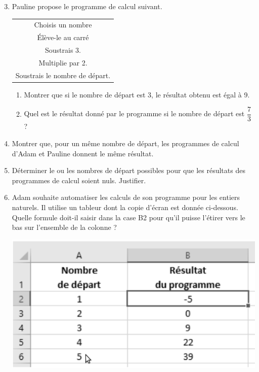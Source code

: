 \begin{enumerate}
	\setcounter{enumi}{2}
	\item Pauline propose le programme de calcul suivant.
	\begin{center}
	\begin{tabular}{|c|}
	\hline
	Choisis un nombre\\
	Élève-le au carré\\
	Soustrais 3.\\
	Multiplie par 2.\\
	Soustrais le nombre de départ.\\ 
	\hline 
	\end{tabular} 
	\end{center}
	\begin{enumerate}
		\item Montrer que si le nombre de départ est 3, le résultat obtenu est égal à 9.
		\item Quel est le résultat donné par le programme si le nombre de départ est $\dfrac{7}{3}$ ?
	\end{enumerate}
	\item Montrer que, pour un même nombre de départ, les programmes de calcul d’Adam et
Pauline donnent le même résultat.
	\item Déterminer le ou les nombres de départ possibles pour que les résultats des programmes
de calcul soient nuls. Justifier.
	\item Adam souhaite automatiser les calculs de son programme pour les entiers naturels. Il
utilise un tableur dont la copie d’écran est donnée ci-dessous.
Quelle formule doit-il saisir dans la case B2 pour qu'il puisse l’étirer vers le bas sur
l'ensemble de la colonne ?
\begin{center}
	\includegraphics[width=.5\textwidth]{./images/2022-g2-ex4-img1.png}
\end{center}
\end{enumerate}
